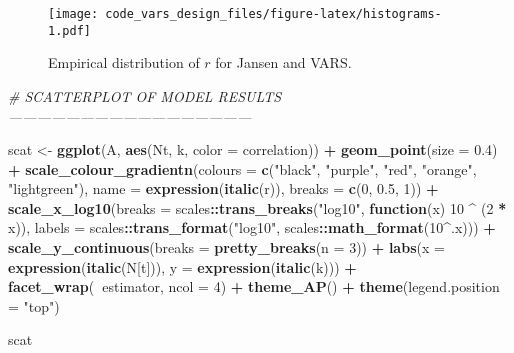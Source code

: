 \documentclass[11pt,]{article}
\newenvironment{Shaded}{\begin{snugshade}}{\end{snugshade}}
\newcommand{\CommentTok}[1]{\textcolor[rgb]{0.56,0.35,0.01}{\textit{#1}}}
\newcommand{\ControlFlowTok}[1]{\textcolor[rgb]{0.13,0.29,0.53}{\textbf{#1}}}
\newcommand{\DataTypeTok}[1]{\textcolor[rgb]{0.13,0.29,0.53}{#1}}
\newcommand{\DecValTok}[1]{\textcolor[rgb]{0.00,0.00,0.81}{#1}}
\newcommand{\FloatTok}[1]{\textcolor[rgb]{0.00,0.00,0.81}{#1}}
\newcommand{\KeywordTok}[1]{\textcolor[rgb]{0.13,0.29,0.53}{\textbf{#1}}}
\newcommand{\NormalTok}[1]{#1}
\newcommand{\OperatorTok}[1]{\textcolor[rgb]{0.81,0.36,0.00}{\textbf{#1}}}
\newcommand{\StringTok}[1]{\textcolor[rgb]{0.31,0.60,0.02}{#1}}
\begin{document}
\begin{figure}
\centering
\texttt{[image: code\_vars\_design\_files/figure-latex/histograms-1.pdf]}
\caption{Empirical distribution of \(r\) for Jansen and VARS.}
\end{figure}

\begin{Shaded}
\begin{Highlighting}[]
\CommentTok{# SCATTERPLOT OF MODEL RESULTS ---------------------------------------------------}

\NormalTok{scat <-}\StringTok{ }\KeywordTok{ggplot}\NormalTok{(A, }\KeywordTok{aes}\NormalTok{(Nt, k, }\DataTypeTok{color =}\NormalTok{ correlation)) }\OperatorTok{+}\StringTok{ }
\StringTok{  }\KeywordTok{geom_point}\NormalTok{(}\DataTypeTok{size =} \FloatTok{0.4}\NormalTok{) }\OperatorTok{+}\StringTok{ }
\StringTok{  }\KeywordTok{scale_colour_gradientn}\NormalTok{(}\DataTypeTok{colours =} \KeywordTok{c}\NormalTok{(}\StringTok{"black"}\NormalTok{, }\StringTok{"purple"}\NormalTok{, }\StringTok{"red"}\NormalTok{, }\StringTok{"orange"}\NormalTok{, }\StringTok{"lightgreen"}\NormalTok{), }
                         \DataTypeTok{name =} \KeywordTok{expression}\NormalTok{(}\KeywordTok{italic}\NormalTok{(r)),                }
                         \DataTypeTok{breaks =} \KeywordTok{c}\NormalTok{(}\DecValTok{0}\NormalTok{, }\FloatTok{0.5}\NormalTok{, }\DecValTok{1}\NormalTok{)) }\OperatorTok{+}
\StringTok{  }\KeywordTok{scale_x_log10}\NormalTok{(}\DataTypeTok{breaks =}\NormalTok{ scales}\OperatorTok{::}\KeywordTok{trans_breaks}\NormalTok{(}\StringTok{"log10"}\NormalTok{, }\ControlFlowTok{function}\NormalTok{(x) }\DecValTok{10} \OperatorTok{^}\StringTok{ }\NormalTok{(}\DecValTok{2} \OperatorTok{*}\StringTok{ }\NormalTok{x)),}
               \DataTypeTok{labels =}\NormalTok{ scales}\OperatorTok{::}\KeywordTok{trans_format}\NormalTok{(}\StringTok{"log10"}\NormalTok{, scales}\OperatorTok{::}\KeywordTok{math_format}\NormalTok{(}\DecValTok{10}\OperatorTok{^}\NormalTok{.x))) }\OperatorTok{+}
\StringTok{  }\KeywordTok{scale_y_continuous}\NormalTok{(}\DataTypeTok{breaks =} \KeywordTok{pretty_breaks}\NormalTok{(}\DataTypeTok{n =} \DecValTok{3}\NormalTok{)) }\OperatorTok{+}
\StringTok{  }\KeywordTok{labs}\NormalTok{(}\DataTypeTok{x =} \KeywordTok{expression}\NormalTok{(}\KeywordTok{italic}\NormalTok{(N[t])), }
       \DataTypeTok{y =} \KeywordTok{expression}\NormalTok{(}\KeywordTok{italic}\NormalTok{(k))) }\OperatorTok{+}\StringTok{ }
\StringTok{  }\KeywordTok{facet_wrap}\NormalTok{(}\OperatorTok{~}\NormalTok{estimator,}
             \DataTypeTok{ncol =} \DecValTok{4}\NormalTok{) }\OperatorTok{+}\StringTok{ }
\StringTok{  }\KeywordTok{theme_AP}\NormalTok{() }\OperatorTok{+}\StringTok{ }
\StringTok{  }\KeywordTok{theme}\NormalTok{(}\DataTypeTok{legend.position =} \StringTok{"top"}\NormalTok{)}

\NormalTok{scat}
\end{Highlighting}
\end{Shaded}
\end{document}
